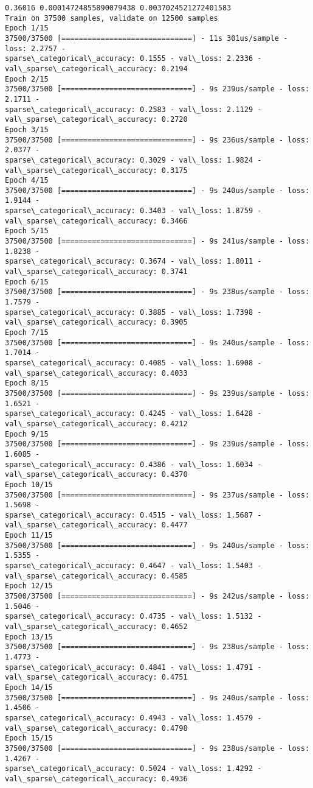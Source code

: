 \documentclass[11pt]{article}
\begin{document}
    \begin{Verbatim}[commandchars=\\\{\}]
0.36016 0.00014724855890079438 0.0037024521272401583
Train on 37500 samples, validate on 12500 samples
Epoch 1/15
37500/37500 [==============================] - 11s 301us/sample - loss: 2.2757 -
sparse\_categorical\_accuracy: 0.1555 - val\_loss: 2.2336 -
val\_sparse\_categorical\_accuracy: 0.2194
Epoch 2/15
37500/37500 [==============================] - 9s 239us/sample - loss: 2.1711 -
sparse\_categorical\_accuracy: 0.2583 - val\_loss: 2.1129 -
val\_sparse\_categorical\_accuracy: 0.2720
Epoch 3/15
37500/37500 [==============================] - 9s 236us/sample - loss: 2.0377 -
sparse\_categorical\_accuracy: 0.3029 - val\_loss: 1.9824 -
val\_sparse\_categorical\_accuracy: 0.3175
Epoch 4/15
37500/37500 [==============================] - 9s 240us/sample - loss: 1.9144 -
sparse\_categorical\_accuracy: 0.3403 - val\_loss: 1.8759 -
val\_sparse\_categorical\_accuracy: 0.3466
Epoch 5/15
37500/37500 [==============================] - 9s 241us/sample - loss: 1.8238 -
sparse\_categorical\_accuracy: 0.3674 - val\_loss: 1.8011 -
val\_sparse\_categorical\_accuracy: 0.3741
Epoch 6/15
37500/37500 [==============================] - 9s 238us/sample - loss: 1.7579 -
sparse\_categorical\_accuracy: 0.3885 - val\_loss: 1.7398 -
val\_sparse\_categorical\_accuracy: 0.3905
Epoch 7/15
37500/37500 [==============================] - 9s 240us/sample - loss: 1.7014 -
sparse\_categorical\_accuracy: 0.4085 - val\_loss: 1.6908 -
val\_sparse\_categorical\_accuracy: 0.4033
Epoch 8/15
37500/37500 [==============================] - 9s 239us/sample - loss: 1.6521 -
sparse\_categorical\_accuracy: 0.4245 - val\_loss: 1.6428 -
val\_sparse\_categorical\_accuracy: 0.4212
Epoch 9/15
37500/37500 [==============================] - 9s 239us/sample - loss: 1.6085 -
sparse\_categorical\_accuracy: 0.4386 - val\_loss: 1.6034 -
val\_sparse\_categorical\_accuracy: 0.4370
Epoch 10/15
37500/37500 [==============================] - 9s 237us/sample - loss: 1.5698 -
sparse\_categorical\_accuracy: 0.4515 - val\_loss: 1.5687 -
val\_sparse\_categorical\_accuracy: 0.4477
Epoch 11/15
37500/37500 [==============================] - 9s 240us/sample - loss: 1.5355 -
sparse\_categorical\_accuracy: 0.4647 - val\_loss: 1.5403 -
val\_sparse\_categorical\_accuracy: 0.4585
Epoch 12/15
37500/37500 [==============================] - 9s 242us/sample - loss: 1.5046 -
sparse\_categorical\_accuracy: 0.4735 - val\_loss: 1.5132 -
val\_sparse\_categorical\_accuracy: 0.4652
Epoch 13/15
37500/37500 [==============================] - 9s 238us/sample - loss: 1.4773 -
sparse\_categorical\_accuracy: 0.4841 - val\_loss: 1.4791 -
val\_sparse\_categorical\_accuracy: 0.4751
Epoch 14/15
37500/37500 [==============================] - 9s 240us/sample - loss: 1.4506 -
sparse\_categorical\_accuracy: 0.4943 - val\_loss: 1.4579 -
val\_sparse\_categorical\_accuracy: 0.4798
Epoch 15/15
37500/37500 [==============================] - 9s 238us/sample - loss: 1.4267 -
sparse\_categorical\_accuracy: 0.5024 - val\_loss: 1.4292 -
val\_sparse\_categorical\_accuracy: 0.4936
    \end{Verbatim}
\end{document}
